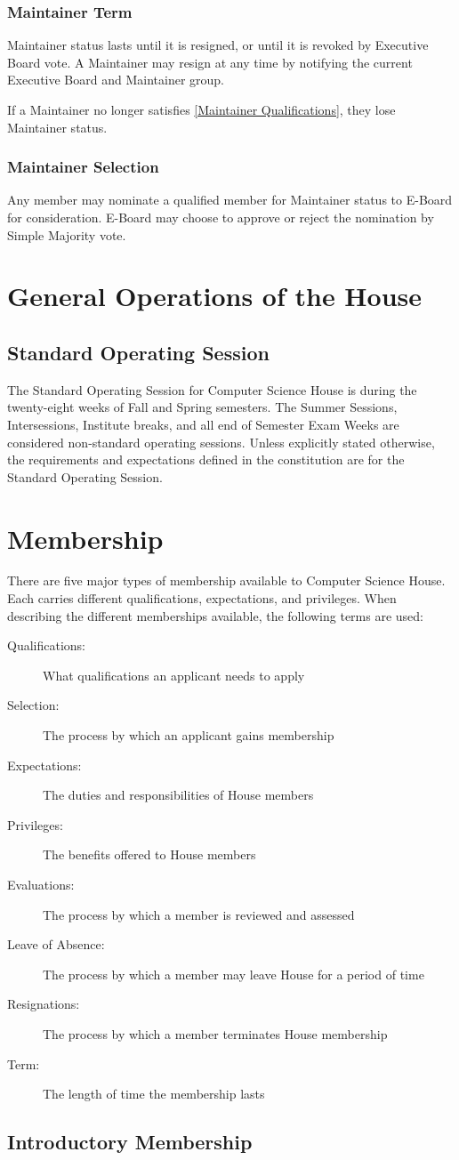 \documentclass{article}
\newcommand{\article}[1]{\section{#1} \label{#1}}
\newcommand{\asection}[1]{\subsection{#1} \label{#1}}
\newcommand{\asubsection}[1]{\subsubsection{#1} \label{#1}}
\begin{document}
\asubsection{Maintainer Term}
Maintainer status lasts until it is resigned, or until it is revoked by Executive Board vote.
A Maintainer may resign at any time by notifying the current Executive Board and Maintainer group.

If a Maintainer no longer satisfies \ref{Maintainer Qualifications}, they lose Maintainer status.

\asubsection{Maintainer Selection}
Any member may nominate a qualified member for Maintainer status to E-Board for consideration.
E-Board may choose to approve or reject the nomination by Simple Majority vote.

\article{General Operations of the House}
\asection{Standard Operating Session}
The Standard Operating Session for Computer Science House is during the twenty-eight weeks of Fall and Spring semesters.
The Summer Sessions, Intersessions, Institute breaks, and all end of Semester Exam Weeks are considered non-standard operating sessions.
Unless explicitly stated otherwise, the requirements and expectations defined in the constitution are for the Standard Operating Session.

\article{Membership}
There are five major types of membership available to Computer Science House.
Each carries different qualifications, expectations, and privileges.
When describing the different memberships available, the following terms are used:
\begin{description}
	\item[Qualifications:] What qualifications an applicant needs to apply
	\item[Selection:] The process by which an applicant gains membership
	\item[Expectations:] The duties and responsibilities of House members
	\item[Privileges:] The benefits offered to House members
	\item[Evaluations:] The process by which a member is reviewed and assessed
	\item[Leave of Absence:] The process by which a member may leave House for a period of time
	\item[Resignations:] The process by which a member terminates House membership
	\item[Term:] The length of time the membership lasts
\end{description}

\asection{Introductory Membership}
\end{document}

